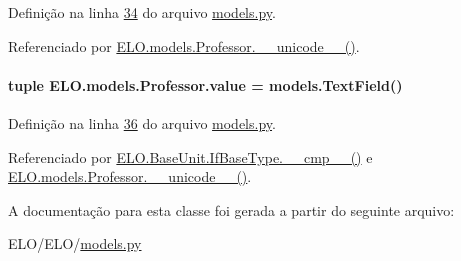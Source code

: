 Definição na linha \hyperlink{ELO_2models_8py_source_l00034}{34} do arquivo \hyperlink{ELO_2models_8py_source}{models.\-py}.



Referenciado por \hyperlink{classELO_1_1models_1_1Professor_aefc9d63d429e19ec3487a7879879f29d}{E\-L\-O.\-models.\-Professor.\-\_\-\-\_\-unicode\-\_\-\-\_\-()}.

\hypertarget{classELO_1_1models_1_1Professor_abfa283169333876d02cf63886ca872e6}{
\paragraph[{value}]{\setlength{\rightskip}{0pt plus 5cm}tuple E\-L\-O.\-models.\-Professor.\-value = models.\-Text\-Field()\hspace{0.3cm}{\ttfamily [static]}}}\label{classELO_1_1models_1_1Professor_abfa283169333876d02cf63886ca872e6}


Definição na linha \hyperlink{ELO_2models_8py_source_l00036}{36} do arquivo \hyperlink{ELO_2models_8py_source}{models.\-py}.



Referenciado por \hyperlink{classELO_1_1BaseUnit_1_1IfBaseType_a69c338f6f1574bd3524e9d59ebc17a7c}{E\-L\-O.\-Base\-Unit.\-If\-Base\-Type.\-\_\-\-\_\-cmp\-\_\-\-\_\-()} e \hyperlink{classELO_1_1models_1_1Professor_aefc9d63d429e19ec3487a7879879f29d}{E\-L\-O.\-models.\-Professor.\-\_\-\-\_\-unicode\-\_\-\-\_\-()}.



A documentação para esta classe foi gerada a partir do seguinte arquivo\-:\begin{DoxyCompactItemize}
\item 
E\-L\-O/\-E\-L\-O/\hyperlink{ELO_2models_8py}{models.\-py}\end{DoxyCompactItemize}
